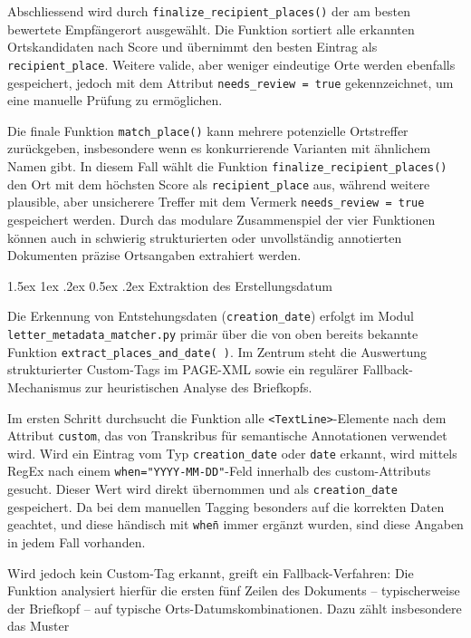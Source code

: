 \documentclass[12pt, a4paper, ngerman, bidi=default]{article}
\makeatletter
\newcommand{\code}[1]{\colorbox{VeryLightGray}{\texttt{#1}}} %
\let\oldparagraph\paragraph%
\renewcommand{\paragraph}{
    \@ifstar%
      \xxxParagraphStar%
      \xxxParagraphNoStar%
 }
\newcommand{\xxxParagraphStar}[1]{\oldparagraph*{#1}\mbox{}}
\newcommand{\xxxParagraphNoStar}[1]{\oldparagraph{#1}\mbox{}}
\renewcommand\paragraph{\@startsection{paragraph}{4}{0em}%
  {1.5ex \@plus1ex \@minus.2ex}%
  {0.5ex \@plus.2ex}%
  {\normalfont\normalsize\bfseries\itshape}}
\makeatother
\begin{document}
Abschliessend wird durch \code{finalize\_recipient\_places()} der am besten bewertete Empfängerort ausgewählt. Die Funktion sortiert alle erkannten Ortskandidaten nach Score und übernimmt den besten Eintrag als \code{recipient\_place}. Weitere valide, aber weniger eindeutige Orte werden ebenfalls gespeichert, jedoch mit dem Attribut \code{needs\_review = true} gekennzeichnet, um eine manuelle Prüfung zu ermöglichen.

Die finale Funktion \code{match\_place()} kann mehrere potenzielle Ortstreffer zurückgeben, insbesondere wenn es konkurrierende Varianten mit ähnlichem Namen gibt. In diesem Fall wählt die Funktion \code{finalize\_recipient\_places()} den Ort mit dem höchsten Score als \code{recipient\_place} aus, während weitere plausible, aber unsicherere Treffer mit dem Vermerk \code{needs\_review = true} gespeichert werden. Durch das modulare Zusammenspiel der vier Funktionen können auch in schwierig strukturierten oder unvollständig annotierten Dokumenten präzise Ortsangaben extrahiert werden.

\paragraph{Extraktion des Erstellungsdatum}

Die Erkennung von Entstehungsdaten (\code{creation\_date}) erfolgt im Modul \code{letter\_metadata\_matcher.py} primär über die von oben bereits bekannte Funktion \code{extract\_places\_and\_date( )}. Im Zentrum steht die Auswertung strukturierter Custom-Tags im PAGE-XML sowie ein regulärer Fallback-Mechanismus zur heuristischen Analyse des Briefkopfs.

Im ersten Schritt durchsucht die Funktion alle \code{<TextLine>}-Elemente nach dem Attribut \code{custom}, das von Transkribus für semantische Annotationen verwendet wird. Wird ein Eintrag vom Typ \texttt{creation\_date} oder \texttt{date} erkannt, wird mittels RegEx nach einem \texttt{when="YYYY-MM-DD"}-Feld innerhalb des custom-Attributs gesucht. Dieser Wert wird direkt übernommen und als \code{creation\_date} gespeichert. Da bei dem manuellen Tagging besonders auf die korrekten Daten geachtet, und diese händisch mit \code{when\=} immer ergänzt wurden, sind diese Angaben in jedem Fall vorhanden.

Wird jedoch kein Custom-Tag erkannt, greift ein Fallback-Verfahren: Die Funktion analysiert hierfür die ersten fünf Zeilen des Dokuments – typischerweise der Briefkopf – auf typische Orts-Datumskombinationen. Dazu zählt insbesondere das Muster
\end{document}
